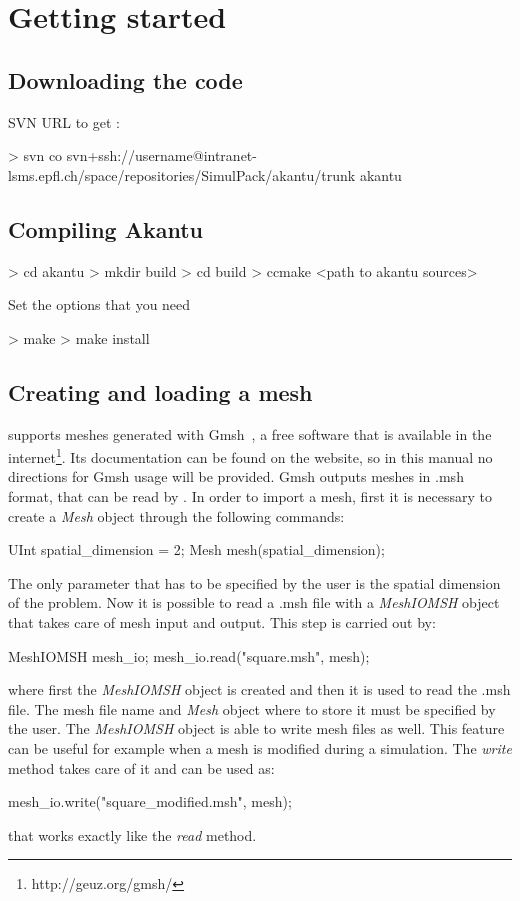 \section{Getting started}
\subsection{Downloading the code}
SVN URL to get \akantu :
\begin{command}
  > svn co svn+ssh://username@intranet-lsms.epfl.ch/space/repositories/SimulPack/akantu/trunk akantu
\end{command}

\subsection{Compiling Akantu}
\begin{command}
  > cd akantu
  > mkdir build
  > cd build
  > ccmake <path to akantu sources>
\end{command}

Set the options that you need

\begin{command}
  > make
  > make install
\end{command}

\subsection{Creating and loading a mesh\label{sect:common:mesh}}

\akantu supports meshes generated with Gmsh~\cite{gmsh}, a free
software that is available in the
internet\footnote{http://geuz.org/gmsh/}. Its documentation can be
found on the website, so in this manual no directions for Gmsh usage
will be provided. Gmsh outputs meshes in .msh format, that can be read
by \akantu. In order to import a mesh, first it is necessary to create
a \textit{Mesh} object through the following commands:
\begin{cpp}
  UInt spatial_dimension = 2;
  Mesh mesh(spatial_dimension);
\end{cpp}
The only parameter that has to be specified by the user is the spatial
dimension of the problem. Now it is possible to read a .msh file with
a \textit{MeshIOMSH} object that takes care of mesh input and
output. This step is carried out by:
\begin{cpp}
  MeshIOMSH mesh_io;
  mesh_io.read("square.msh", mesh);
\end{cpp}
where first the \textit{MeshIOMSH} object is created and then it is
used to read the .msh file. The mesh file name and \textit{Mesh}
object where to store it must be specified by the user. The
\textit{MeshIOMSH} object is able to write mesh files as well. This
feature can be useful for example when a mesh is modified during a
simulation. The \textit{write} method takes care of it and can be used
as:
\begin{cpp}
  mesh_io.write("square_modified.msh", mesh);
\end{cpp}
that works exactly like the \textit{read} method.

